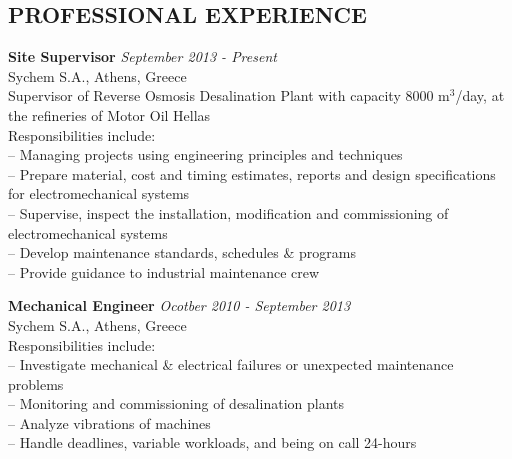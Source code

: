 \documentclass[11pt]{res} %
\begin{document}
\begin{resume}
\vspace{0.9in} %



\section{PROFESSIONAL EXPERIENCE} 
\vspace{8pt} %

\small\textbf{Site Supervisor} \hfill {\sl September 2013 - Present} \\
Sychem S.A., Athens, Greece\\
Supervisor of Reverse Osmosis Desalination Plant with capacity 8000 m$^3$/day, at the refineries of Motor Oil Hellas\\
Responsibilities include:\\
-- Managing projects using engineering principles and techniques\\
-- Prepare material, cost and timing estimates, reports and design specifications for electromechanical systems\\
-- Supervise, inspect the installation, modification and commissioning of electromechanical systems \\
-- Develop maintenance standards, schedules \& programs \\
-- Provide guidance to industrial maintenance crew


\small\textbf{Mechanical Engineer} \hfill {\sl Ocotber 2010 - September 2013} \\
Sychem S.A., Athens, Greece\\
Responsibilities include:\\
-- Investigate mechanical \& electrical failures or unexpected maintenance problems\\
-- Monitoring and commissioning of desalination plants\\
-- Analyze vibrations of machines\\
-- Handle deadlines, variable workloads, and being on call 24-hours


\end{resume}
\end{document}
